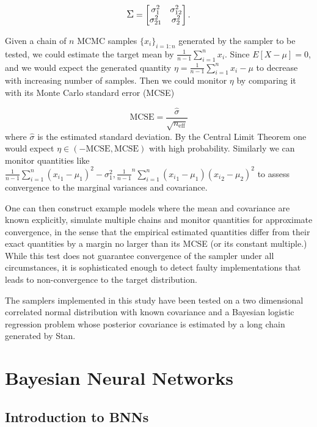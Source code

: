 \documentclass[12pt]{report}
\begin{document}
\begin{displaymath}
\mathlarger{\Sigma} = 
\begin{bmatrix}
\sigma^2_1 &\sigma_{12}^2 \\
\sigma_{21}^2 &\sigma^2_2 \\
\end{bmatrix}.
\end{displaymath}

Given a chain of $n$ MCMC samples $\{x_i\}_{i=1:n}$ generated by the sampler to be tested, we could estimate  the target mean by $ \frac{1}{n-1} \sum_{i=1}^ n x_i$. Since $E[X-\mu] = 0$, and we would expect the generated quantity $\eta= \frac{1}{n-1} \sum_{i=1}^ n x_i -\mu$ to decrease with increasing number of samples. Then we could monitor $\eta$ by comparing it with its Monte Carlo standard error (MCSE) 

\[ \text{MCSE} = \frac{\hat{\sigma}}{\sqrt{n_{\text{eff}}}} \]
where $\hat{\sigma}$ is the estimated standard deviation. By the Central Limit Theorem one would expect  $\eta \in (-\text{MCSE},\text{MCSE})$ with high probability. Similarly we can monitor quantities like $\frac{1}{n-1} \sum_{i=1}^n ({x_i}_1 -\mu_1)^2 - \sigma^2_1,  \frac{1}{n-1}^n \sum_{i=1}^n ({x_i}_1 - \mu_1)({x_i}_2 - \mu_2)^2 $ to assess convergence to the marginal variances and covariance.

One can then construct example models where the mean and covariance are known explicitly, simulate multiple chains and monitor quantities for approximate convergence, in the sense that the empirical estimated quantities differ from their exact quantities by a margin no larger than its MCSE (or its constant multiple.) While this test does not guarantee convergence of the sampler under all circumstances, it is sophisticated enough to detect faulty implementations that leads to non-convergence to the target distribution.

The samplers implemented in this study have been tested on a two dimensional correlated normal distribution with known covariance and a Bayesian logistic regression problem whose posterior covariance is estimated by a long chain generated by Stan.

\chapter{Bayesian Neural Networks}
\section{Introduction to BNNs}
\end{document}
